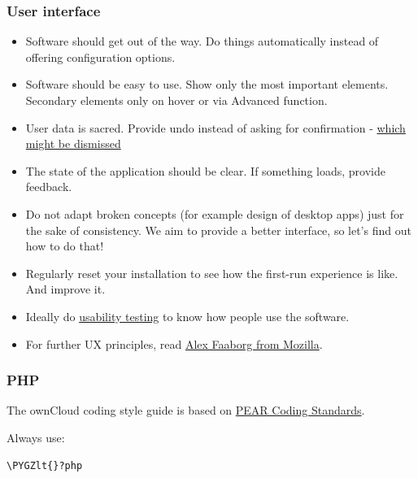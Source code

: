 \documentclass[letterpaper,10pt,english]{sphinxmanual}
\def\PYGZlt{\char`\<}
\begin{document}
\subsubsection{User interface}
\label{general/codingguidelines:user-interface}\begin{itemize}
\item {} 
Software should get out of the way. Do things automatically instead of offering configuration options.

\item {} 
Software should be easy to use. Show only the most important elements. Secondary elements only on hover or via Advanced function.

\item {} 
User data is sacred. Provide undo instead of asking for confirmation - \href{http://www.alistapart.com/articles/neveruseawarning/}{which might be dismissed}

\item {} 
The state of the application should be clear. If something loads, provide feedback.

\item {} 
Do not adapt broken concepts (for example design of desktop apps) just for the sake of consistency. We aim to provide a better interface, so let's find out how to do that!

\item {} 
Regularly reset your installation to see how the first-run experience is like. And improve it.

\item {} 
Ideally do \href{http://jancborchardt.net/usability-in-free-software}{usability testing} to know how people use the software.

\item {} 
For further UX principles, read \href{http://uxmag.com/articles/quantifying-usability}{Alex Faaborg from Mozilla}.

\end{itemize}


\subsubsection{PHP}
\label{general/codingguidelines:php}
The ownCloud coding style guide is based on \href{http://pear.php.net/manual/en/standards.php}{PEAR Coding Standards}.

Always use:

\begin{Verbatim}[commandchars=\\\{\}]
\PYGZlt{}?php
\end{Verbatim}
\end{document}
